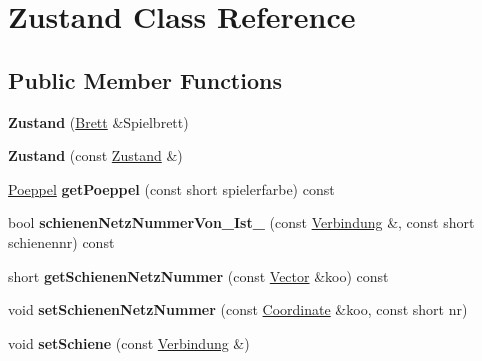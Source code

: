 \hypertarget{class_zustand}{\section{Zustand Class Reference}
\label{class_zustand}
}
\subsection*{Public Member Functions}
\begin{DoxyCompactItemize}
\item 
\hypertarget{class_zustand_a410324ad5c01c1127abecdc679614558}{{\bfseries Zustand} (\hyperlink{class_brett}{Brett} \&Spielbrett)}\label{class_zustand_a410324ad5c01c1127abecdc679614558}

\item 
\hypertarget{class_zustand_aa4ba7f6949af30626a99ce39abed0530}{{\bfseries Zustand} (const \hyperlink{class_zustand}{Zustand} \&)}\label{class_zustand_aa4ba7f6949af30626a99ce39abed0530}

\item 
\hypertarget{class_zustand_a7c423e5ed9d1710d23dc42ae4cea3fdd}{\hyperlink{class_poeppel}{Poeppel} {\bfseries get\-Poeppel} (const short spielerfarbe) const }\label{class_zustand_a7c423e5ed9d1710d23dc42ae4cea3fdd}

\item 
\hypertarget{class_zustand_a6fec4433f91b9fd1abd3ce4d3b2ee562}{bool {\bfseries schienen\-Netz\-Nummer\-Von\-\_\-\-Ist\-\_\-} (const \hyperlink{class_verbindung}{Verbindung} \&, const short schienennr) const }\label{class_zustand_a6fec4433f91b9fd1abd3ce4d3b2ee562}

\item 
\hypertarget{class_zustand_ab88277c8bc572aa6b76f96a05471c6e4}{short {\bfseries get\-Schienen\-Netz\-Nummer} (const \hyperlink{class_vector}{Vector} \&koo) const }\label{class_zustand_ab88277c8bc572aa6b76f96a05471c6e4}

\item 
\hypertarget{class_zustand_af079579ce91bf5cde6b9d1e00d157399}{void {\bfseries set\-Schienen\-Netz\-Nummer} (const \hyperlink{class_coordinate}{Coordinate} \&koo, const short nr)}\label{class_zustand_af079579ce91bf5cde6b9d1e00d157399}

\item 
\hypertarget{class_zustand_a92003ddf9471d768ef544957474ce168}{void {\bfseries set\-Schiene} (const \hyperlink{class_verbindung}{Verbindung} \&)}\label{class_zustand_a92003ddf9471d768ef544957474ce168}


\end{DoxyCompactItemize}
